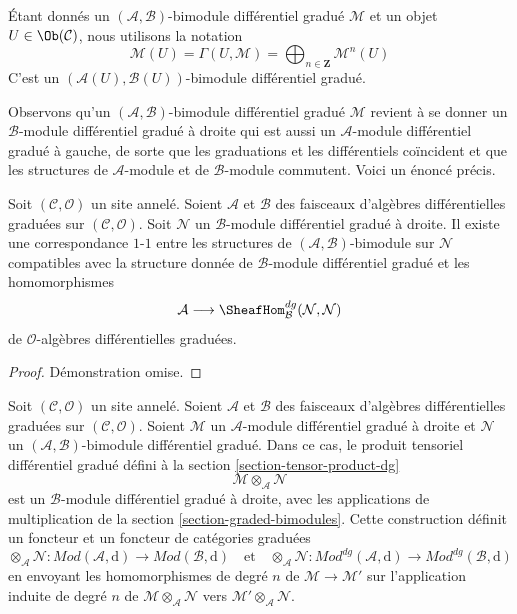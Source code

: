 \noindent
Étant donnés un $(\mathcal{A}, \mathcal{B})$-bimodule différentiel gradué $\mathcal{M}$ et un objet $U \in \Ob(\mathcal{C})$, nous utilisons la notation
$$
\mathcal{M}(U) =
\Gamma(U, \mathcal{M}) =
\bigoplus\nolimits_{n \in \mathbf{Z}} \mathcal{M}^n(U)
$$
C'est un $(\mathcal{A}(U), \mathcal{B}(U))$-bimodule différentiel gradué.

\medskip\noindent
Observons qu'un $(\mathcal{A}, \mathcal{B})$-bimodule différentiel gradué $\mathcal{M}$ revient à se donner un $\mathcal{B}$-module différentiel gradué à droite qui est aussi un $\mathcal{A}$-module différentiel gradué à gauche, de sorte que les graduations et les différentiels coïncident et que les structures de $\mathcal{A}$-module et de $\mathcal{B}$-module commutent.
Voici un énoncé précis.

\begin{lemma}
\label{lemma-what-makes-a-bimodule-dg}
Soit $(\mathcal{C}, \mathcal{O})$ un site annelé.
Soient $\mathcal{A}$ et $\mathcal{B}$ des faisceaux d'algèbres différentielles graduées sur $(\mathcal{C}, \mathcal{O})$.
Soit $\mathcal{N}$ un $\mathcal{B}$-module différentiel gradué à droite.
Il existe une correspondance $1$-$1$ entre les structures de $(\mathcal{A}, \mathcal{B})$-bimodule sur $\mathcal{N}$ compatibles avec la structure donnée de $\mathcal{B}$-module différentiel gradué et les homomorphismes
$$
\mathcal{A}
\longrightarrow
\SheafHom^{dg}_\mathcal{B}(\mathcal{N}, \mathcal{N})
$$
de $\mathcal{O}$-algèbres différentielles graduées.
\end{lemma}

\begin{proof}
Démonstration omise.
\end{proof}

\noindent
Soit $(\mathcal{C}, \mathcal{O})$ un site annelé.
Soient $\mathcal{A}$ et $\mathcal{B}$ des faisceaux d'algèbres différentielles graduées sur $(\mathcal{C}, \mathcal{O})$.
Soient $\mathcal{M}$ un $\mathcal{A}$-module différentiel gradué à droite et $\mathcal{N}$ un $(\mathcal{A}, \mathcal{B})$-bimodule différentiel gradué.
Dans ce cas, le produit tensoriel différentiel gradué défini à la section \ref{section-tensor-product-dg}
$$
\mathcal{M} \otimes_\mathcal{A} \mathcal{N}
$$
est un $\mathcal{B}$-module différentiel gradué à droite, avec les applications de multiplication de la section \ref{section-graded-bimodules}.
Cette construction définit un foncteur et un foncteur de catégories graduées
$$
\otimes_\mathcal{A} \mathcal{N} :
\textit{Mod}(\mathcal{A}, \text{d})
\longrightarrow
\textit{Mod}(\mathcal{B}, \text{d})
\quad\text{et}\quad
\otimes_\mathcal{A} \mathcal{N} :
\textit{Mod}^{dg}(\mathcal{A}, \text{d})
\longrightarrow
\textit{Mod}^{dg}(\mathcal{B}, \text{d})
$$
en envoyant les homomorphismes de degré $n$ de $\mathcal{M} \to \mathcal{M}'$ sur l'application induite de degré $n$ de $\mathcal{M} \otimes_\mathcal{A} \mathcal{N}$ vers $\mathcal{M}' \otimes_\mathcal{A} \mathcal{N}$.

